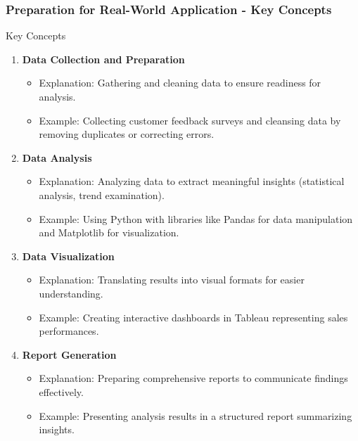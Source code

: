 \documentclass[aspectratio=169]{beamer}
\begin{document}
\begin{frame}[fragile]
    \frametitle{Preparation for Real-World Application - Key Concepts}
    \begin{block}{Key Concepts}
        \begin{enumerate}
            \item \textbf{Data Collection and Preparation}
                \begin{itemize}
                    \item Explanation: Gathering and cleaning data to ensure readiness for analysis.
                    \item Example: Collecting customer feedback surveys and cleansing data by removing duplicates or correcting errors.
                \end{itemize}
            
            \item \textbf{Data Analysis}
                \begin{itemize}
                    \item Explanation: Analyzing data to extract meaningful insights (statistical analysis, trend examination).
                    \item Example: Using Python with libraries like Pandas for data manipulation and Matplotlib for visualization.
                \end{itemize}
            
            \item \textbf{Data Visualization}
                \begin{itemize}
                    \item Explanation: Translating results into visual formats for easier understanding.
                    \item Example: Creating interactive dashboards in Tableau representing sales performances.
                \end{itemize}
             
            \item \textbf{Report Generation}
                \begin{itemize}
                    \item Explanation: Preparing comprehensive reports to communicate findings effectively.
                    \item Example: Presenting analysis results in a structured report summarizing insights.
                \end{itemize}
        \end{enumerate}
    \end{block}
\end{frame}
\end{document}
